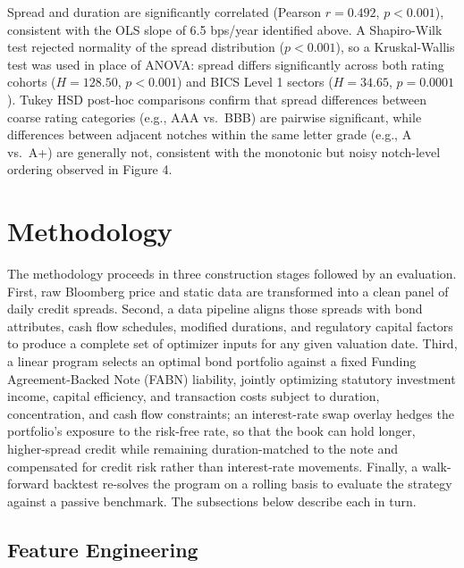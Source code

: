 \documentclass[12pt]{article}
\begin{document}
Spread and duration are significantly correlated (Pearson $r = 0.492$, $p < 0.001$), consistent with the OLS slope of 6.5 bps/year identified above. A Shapiro-Wilk test rejected normality of the spread distribution ($p < 0.001$), so a Kruskal-Wallis test was used in place of ANOVA: spread differs significantly across both rating cohorts ($H = 128.50$, $p < 0.001$) and BICS Level 1 sectors ($H = 34.65$, $p = 0.0001$). Tukey HSD post-hoc comparisons confirm that spread differences between coarse rating categories (e.g., AAA vs.\ BBB) are pairwise significant, while differences between adjacent notches within the same letter grade (e.g., A vs.\ A+) are generally not, consistent with the monotonic but noisy notch-level ordering observed in Figure 4.

\section{Methodology}

The methodology proceeds in three construction stages followed by an evaluation. First, raw Bloomberg price and static data are transformed into a clean panel of daily credit spreads. Second, a data pipeline aligns those spreads with bond attributes, cash flow schedules, modified durations, and regulatory capital factors to produce a complete set of optimizer inputs for any given valuation date. Third, a linear program selects an optimal bond portfolio against a fixed Funding Agreement-Backed Note (FABN) liability, jointly optimizing statutory investment income, capital efficiency, and transaction costs subject to duration, concentration, and cash flow constraints; an interest-rate swap overlay hedges the portfolio's exposure to the risk-free rate, so that the book can hold longer, higher-spread credit while remaining duration-matched to the note and compensated for credit risk rather than interest-rate movements. Finally, a walk-forward backtest re-solves the program on a rolling basis to evaluate the strategy against a passive benchmark. The subsections below describe each in turn.

\subsection{Feature Engineering}
\end{document}
